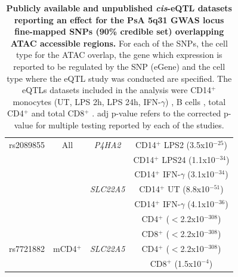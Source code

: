 \begin{table}[htbp]
\begin{tabular}{@{} c c c c}
\midrule
rs2089855    & All                       & \textit{P4HA2}   & CD14$^+$ LPS2 (3.5x10$^{-25}$)\\
             &                           &                  & CD14$^+$ LPS24 (1.1x10$^{-34}$) \\
						 &                           &                  & CD14$^+$ IFN-$\gamma$ (3.1x10$^{-34}$) \\
             &                           & \textit{SLC22A5} & CD14$^+$ UT (8.8x10$^{-51}$) \\
						 &                           &                  & CD14$^+$ IFN-$\gamma$ (4.1x10$^{-36}$)\\
						 &                           &                  & CD4$^+$ ($<$2.2x10$^{-308}$) \\
						 &                           &                  & CD8$^+$ ($<$2.2x10$^{-308}$)  \\
\midrule
rs7721882    & mCD4$^+$                  & \textit{SLC22A5} & CD4$^+$ ($<$2.2x10$^{-308}$) \\
             &                           &                  & CD8$^+$ (1.5x10$^{-4}$) \\							
\bottomrule
\end{tabular}
\medskip %
\caption[Publicly available \textit{cis}-eQTL datasets reporting an effect for the PsA 5q31 GWAS locus fine-mapped SNPs (90\% credible set) overlapping ATAC accessible regions.]{\textbf{Publicly available and unpublished \textit{cis}-eQTL datasets reporting an effect for the PsA 5q31 GWAS locus fine-mapped SNPs (90\% credible set) overlapping ATAC accessible regions.} For each of the SNPs, the cell type for the ATAC overlap, the gene which expression is reported to be regulated by the SNP (eGene) and the cell type where the eQTL study was conducted are specified. The eQTLs datasets included in the analysis were CD14$^+$ monocytes (UT, LPS 2h, LPS 24h, IFN-$\gamma$) \parencite{Fairfax2014}, B cells \parencite{Fairfax2012}, total CD4$^+$ and total CD8$^+$ \parencite{Kasela2017}. adj p-value refers to the corrected p-value for multiple testing reported by each of the studies.} %
\label{tab:5q31_SNPs_ATAC_eQTL}
\end{table}


